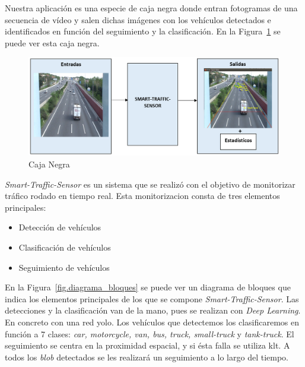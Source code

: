 Nuestra aplicación es una especie de caja negra donde entran fotogramas de una secuencia de vídeo y salen dichas imágenes con los vehículos detectados e identificados en función del seguimiento y la clasificación. En la Figura~\ref{fig.caja_negra} se puede ver esta caja negra.

\begin{figure}[H] 
\begin{center}
	\includegraphics[width=1\textwidth]{figures/Diseno_global/caja_negra.PNG}
   \caption{Caja Negra}
	\label{fig.caja_negra}
\end{center}
\end{figure}

\textit{Smart-Traffic-Sensor} es un sistema que se realizó con el objetivo de monitorizar tráfico rodado en tiempo real. Esta monitorizacion consta de tres elementos principales:

\begin{itemize}
    \item Detección de vehículos
    \item Clasificación de vehículos
    \item Seguimiento de vehículos
\end{itemize}

En la Figura~\ref{fig.diagrama_bloques} se puede ver un diagrama de bloques que indica los elementos principales de los que se compone \textit{Smart-Traffic-Sensor}. Las detecciones y la clasificación van de la mano, pues se realizan con \textit{Deep Learning}. En concreto con una red \acrshort{yolo}. Los vehículos que detectemos los clasificaremos en función a 7 clases:  \textit{car, motorcycle, van, bus, truck, small-truck} y \textit{tank-truck}. El seguimiento se centra en la proximidad espacial, y si ésta falla se utiliza \acrshort{klt}. A todos los \textit{blob} detectados se les realizará un seguimiento a lo largo del tiempo. 

